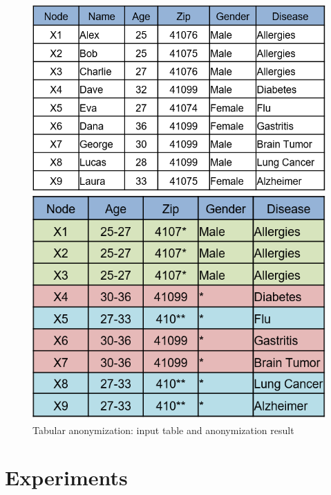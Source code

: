 \documentclass{llncs}
\begin{document}
\begin{figure}[!t]
	\centering
	\begin{minipage}[b]{0.535\textwidth}
		\includegraphics[width=\textwidth]{figures/theory/k_anon_input}
	\end{minipage}
	\hfill
	\begin{minipage}[b]{0.448\textwidth}
		\includegraphics[width=\textwidth]{figures/theory/k_anon_output}
	\end{minipage}
	\caption{Tabular anonymization: input table and anonymization result}
	\label{fig:anonymized_clusters}
\end{figure}



\section{Experiments}
\label{sect:experiments}
\end{document}
